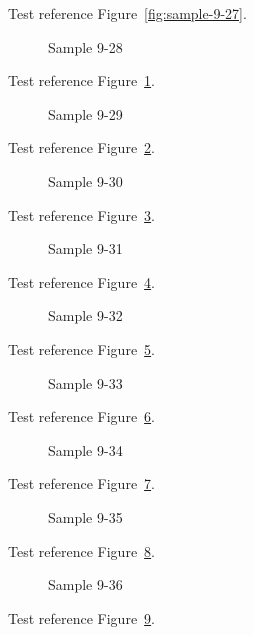 Test reference Figure~\ref{fig:sample-9-27}.

\begin{figure}[tbhp]
\caption{Sample 9-28}
\label{fig:sample-9-28}
\end{figure}

Test reference Figure~\ref{fig:sample-9-28}.

\begin{figure}[tbhp]
\caption{Sample 9-29}
\label{fig:sample-9-29}
\end{figure}

Test reference Figure~\ref{fig:sample-9-29}.

\begin{figure}[tbhp]
\caption{Sample 9-30}
\label{fig:sample-9-30}
\end{figure}

Test reference Figure~\ref{fig:sample-9-30}.

\begin{figure}[tbhp]
\caption{Sample 9-31}
\label{fig:sample-9-31}
\end{figure}

Test reference Figure~\ref{fig:sample-9-31}.

\begin{figure}[tbhp]
\caption{Sample 9-32}
\label{fig:sample-9-32}
\end{figure}

Test reference Figure~\ref{fig:sample-9-32}.

\begin{figure}[tbhp]
\caption{Sample 9-33}
\label{fig:sample-9-33}
\end{figure}

Test reference Figure~\ref{fig:sample-9-33}.

\begin{figure}[tbhp]
\caption{Sample 9-34}
\label{fig:sample-9-34}
\end{figure}

Test reference Figure~\ref{fig:sample-9-34}.

\begin{figure}[tbhp]
\caption{Sample 9-35}
\label{fig:sample-9-35}
\end{figure}

Test reference Figure~\ref{fig:sample-9-35}.

\begin{figure}[tbhp]
\caption{Sample 9-36}
\label{fig:sample-9-36}
\end{figure}

Test reference Figure~\ref{fig:sample-9-36}.


